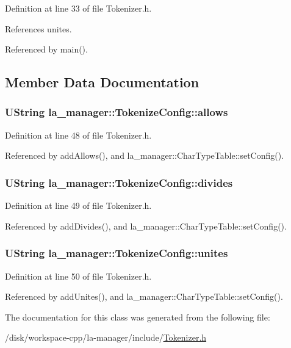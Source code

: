 Definition at line 33 of file Tokenizer.h.

References unites.

Referenced by main().

\subsection{Member Data Documentation}
\hypertarget{classla__manager_1_1TokenizeConfig_a170be8e7618b3c6f451bb1e02738c09}{
\subsubsection[{allows}]{\setlength{\rightskip}{0pt plus 5cm}UString {\bf la\_\-manager::TokenizeConfig::allows}}}
\label{classla__manager_1_1TokenizeConfig_a170be8e7618b3c6f451bb1e02738c09}




Definition at line 48 of file Tokenizer.h.

Referenced by addAllows(), and la\_\-manager::CharTypeTable::setConfig().\hypertarget{classla__manager_1_1TokenizeConfig_20aa25a2db309aa7ca676e2808aee4f6}{
\subsubsection[{divides}]{\setlength{\rightskip}{0pt plus 5cm}UString {\bf la\_\-manager::TokenizeConfig::divides}}}
\label{classla__manager_1_1TokenizeConfig_20aa25a2db309aa7ca676e2808aee4f6}




Definition at line 49 of file Tokenizer.h.

Referenced by addDivides(), and la\_\-manager::CharTypeTable::setConfig().\hypertarget{classla__manager_1_1TokenizeConfig_1422c8a46ddfd381f60ec3b302a47555}{
\subsubsection[{unites}]{\setlength{\rightskip}{0pt plus 5cm}UString {\bf la\_\-manager::TokenizeConfig::unites}}}
\label{classla__manager_1_1TokenizeConfig_1422c8a46ddfd381f60ec3b302a47555}




Definition at line 50 of file Tokenizer.h.

Referenced by addUnites(), and la\_\-manager::CharTypeTable::setConfig().

The documentation for this class was generated from the following file:\begin{CompactItemize}
\item 
/disk/workspace-cpp/la-manager/include/\hyperlink{Tokenizer_8h}{Tokenizer.h}\end{CompactItemize}
